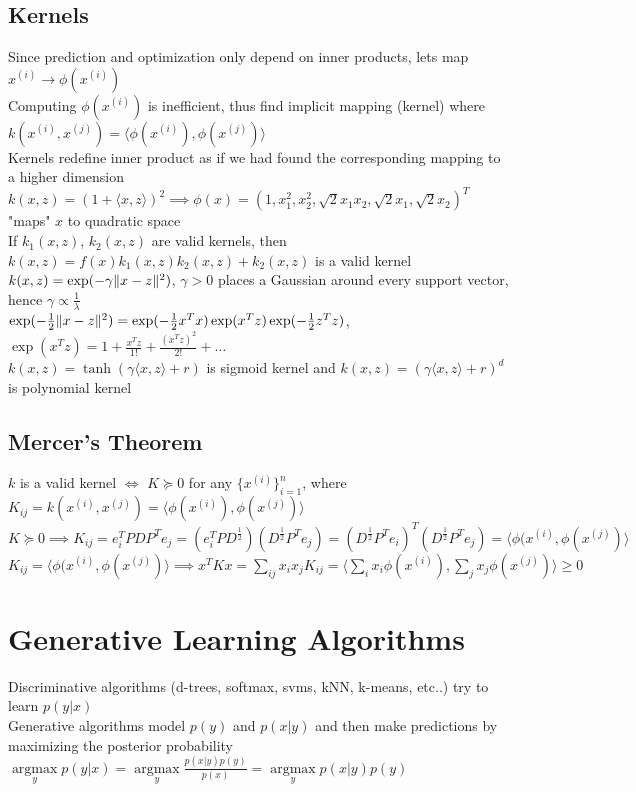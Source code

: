 \documentclass{article}
\newcommand\inner[2]{\langle #1, #2 \rangle}
\DeclareMathOperator*{\argmax}{argmax}
\DeclarePairedDelimiter\norm{\lVert}{\rVert}
\begin{document}
\subsection{Kernels}
Since prediction and optimization only depend on inner products, lets map $x^{(i)} \to \phi(x^{(i)})$ \\
Computing $\phi(x^{(i)})$ is inefficient, thus find implicit mapping (kernel) where $k(x^{(i)}, x^{(j)}) = \inner{\phi(x^{(i)})}{\phi(x^{(j)})}$ \\
Kernels redefine inner product as if we had found the corresponding mapping to a higher dimension \\
$k(x,z) = (1 + \inner{x}{z})^2 \implies \phi(x) = (1, x_1^2, x_2^2, \sqrt{2}x_1x_2, \sqrt{2}x_1, \sqrt{2}x_2)^T$ "maps" $x$ to quadratic space \\
If $k_1(x, z)$, $k_2(x, z)$ are valid kernels, then $k(x, z) = f(x)k_1(x, z)k_2(x, z) + k_2(x, z)$ is a valid kernel \\
$k(x, z) = \exp(-\gamma \norm{x-z}^2)$, $\gamma > 0$ places a Gaussian around every support vector, hence $\gamma \propto \frac{1}{\lambda}$ \\
$\exp(-\frac{1}{2}\norm{x-z}^2) = \exp(-\frac{1}{2}x^Tx)\exp(x^Tz)\exp(-\frac{1}{2}z^Tz)$, $\exp(x^Tz) = 1 + \frac{x^Tz}{1!} + \frac{(x^Tz)^2}{2!} + \ldots$ \\
$k(x,z) = \tanh(\gamma\inner{x}{z} + r)$ is sigmoid kernel and $k(x, z) = (\gamma\inner{x}{z} + r)^d$ is polynomial kernel

\subsection{Mercer's Theorem}
$k$ is a valid kernel $\iff$ $K \succeq 0$ for any $\{x^{(i)}\}_{i=1}^n$, where $K_{ij} = k(x^{(i)}, x^{(j)})  = \inner{\phi(x^{(i)})}{\phi(x^{(j)})}$ \\
$K \succeq 0 \implies K_{ij} = e_i^TPDP^Te_j = (e_i^TPD^{\frac{1}{2}})(D^{\frac{1}{2}}P^Te_j) = (D^\frac{1}{2}P^Te_i)^T(D^\frac{1}{2}P^Te_j) = \inner{\phi(x^{(i)}}{\phi(x^{(j)})}$ \\
$K_{ij} = \inner{\phi(x^{(i)}}{\phi(x^{(j)})} \implies x^TKx = \sum_{ij} x_ix_j K_{ij} = \inner{\sum_i x_i \phi(x^{(i)})}{\sum_j x_j \phi(x^{(j)})} \geq 0 $

\section{Generative Learning Algorithms}
Discriminative algorithms (d-trees, softmax, svms, kNN, k-means, etc..) try to learn $p(y|x)$ \\
Generative algorithms model $p(y)$ and $p(x|y)$ and then make predictions by maximizing the posterior probability $\argmax\limits_y p(y|x) = \argmax\limits_y \frac{p(x|y)p(y)}{p(x)} = \argmax\limits_y p(x|y)p(y)$ 
\end{document}
